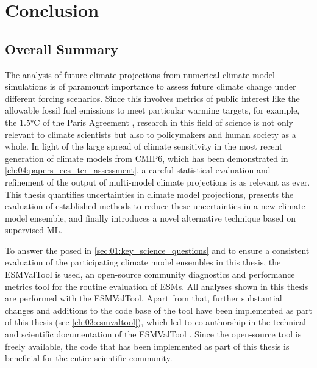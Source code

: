 
%



\chapter{Conclusion}
\label{ch:07:conclusion}


\section{Overall Summary}
\label{sec:07:overall_summary}

The analysis of future climate projections from numerical climate model
simulations is of paramount importance to assess future climate change under
different forcing scenarios. Since this involves metrics of public interest
like the allowable fossil fuel emissions to meet particular warming targets,
for example, the $1.5 \unit{\degreeCelsius}$ of the Paris Agreement
\autocite{UNFCCC2015}, research in this field of science is not only relevant
to climate scientists but also to policymakers and human society as a whole. In
light of the large spread of climate sensitivity in the most recent generation
of climate models from \acs{CMIP}6, which has been demonstrated in
\cref{ch:04:papers_ecs_tcr_assessment}, a careful statistical evaluation and
refinement of the output of multi-model climate projections is as relevant as
ever. This thesis quantifies uncertainties in climate model projections,
presents the evaluation of established methods to reduce these uncertainties in
a new climate model ensemble, and finally introduces a novel alternative
technique based on supervised \ac{ML}.

To answer the  posed in
\cref{sec:01:key_science_questions} and to ensure a consistent evaluation of
the participating climate model ensembles in this thesis, the \ac{ESMValTool}
is used, an open-source community diagnostics and performance metrics tool for
the routine evaluation of \acp{ESM}. All analyses shown in this thesis are
performed with the \ac{ESMValTool}. Apart from that, further substantial
changes and additions to the code base of the tool have been implemented as
part of this thesis (see \cref{ch:03:esmvaltool}), which led to co-authorship
in the technical and scientific documentation of the \ac{ESMValTool}
\autocite{Eyring2020, Lauer2020, Righi2020, Weigel2021}. Since the open-source
tool is freely available, the code that has been implemented as part of this
thesis is beneficial for the entire scientific community.

